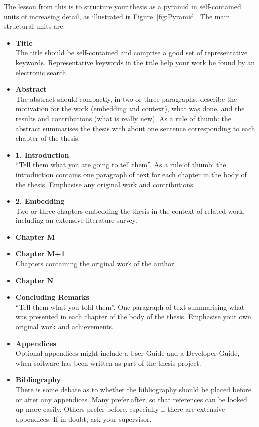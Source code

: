 The lesson from this is to structure your thesis as a pyramid in
self-contained units of increasing detail, as illustrated in
Figure~\ref{fig:Pyramid}. The main structural units are:
\begin{itemize}
\item \textbf{Title} \\
The title should be self-contained and comprise a good set of
representative keywords. Representative keywords in the title help
your work be found by an electronic search.

\item \textbf{Abstract} \\
The abstract should compactly, in two or three paragraphs, describe
the motivation for the work (embedding and context), what was done, and
the results and contributions (what is really new). As a rule of
thumb: the abstract summarises the thesis with about one sentence
corresponding to each chapter of the thesis.


\item \textbf{1. Introduction} \\
``Tell them what you are going to tell them''. As a rule of thumb: the
introduction contains one paragraph of text for each chapter in the
body of the thesis. Emphasise any original work and contributions.

\item \textbf{2. Embedding} \\
Two or three chapters embedding the thesis in the context of related
work, including an extensive literature survey.

\item \textbf{Chapter M}

\item \textbf{Chapter M+1} \\
Chapters containing the original work of the author.

\item \textbf{Chapter N}

\item \textbf{Concluding Remarks} \\
``Tell them what you told them''. One paragraph of text summarising
what was presented in each chapter of the body of the thesis.
Emphasise your own original work and achievements.

\item \textbf{Appendices} \\
Optional appendices might include a User Guide and a Developer
Guide, when software has been written as part of the thesis project.

\item \textbf{Bibliography} \\
There is some debate as to whether the bibliography should
be placed before or after any appendices. Many prefer after,
so that references can be looked up more easily. Others
prefer before, especially if there are extensive appendices.
If in doubt, ask your supervisor.

\end{itemize}





